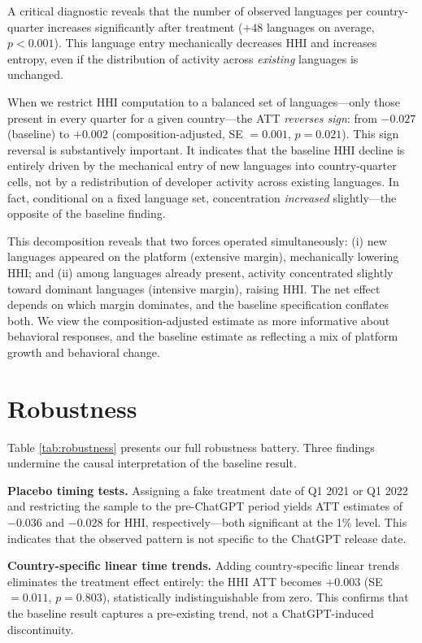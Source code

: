 \documentclass[12pt]{article}
\begin{document}
A critical diagnostic reveals that the number of observed languages per country-quarter increases significantly after treatment ($+48$ languages on average, $p < 0.001$). This language entry mechanically decreases HHI and increases entropy, even if the distribution of activity across \textit{existing} languages is unchanged.

When we restrict HHI computation to a balanced set of languages---only those present in every quarter for a given country---the ATT \textit{reverses sign}: from $-0.027$ (baseline) to $+0.002$ (composition-adjusted, SE $= 0.001$, $p = 0.021$). This sign reversal is substantively important. It indicates that the baseline HHI decline is entirely driven by the mechanical entry of new languages into country-quarter cells, not by a redistribution of developer activity across existing languages. In fact, conditional on a fixed language set, concentration \textit{increased} slightly---the opposite of the baseline finding.

This decomposition reveals that two forces operated simultaneously: (i) new languages appeared on the platform (extensive margin), mechanically lowering HHI; and (ii) among languages already present, activity concentrated slightly toward dominant languages (intensive margin), raising HHI. The net effect depends on which margin dominates, and the baseline specification conflates both. We view the composition-adjusted estimate as more informative about behavioral responses, and the baseline estimate as reflecting a mix of platform growth and behavioral change.

\section{Robustness}

Table \ref{tab:robustness} presents our full robustness battery. Three findings undermine the causal interpretation of the baseline result.

\textbf{Placebo timing tests.} Assigning a fake treatment date of Q1 2021 or Q1 2022 and restricting the sample to the pre-ChatGPT period yields ATT estimates of $-0.036$ and $-0.028$ for HHI, respectively---both significant at the 1\% level. This indicates that the observed pattern is not specific to the ChatGPT release date.

\textbf{Country-specific linear time trends.} Adding country-specific linear trends eliminates the treatment effect entirely: the HHI ATT becomes $+0.003$ (SE $= 0.011$, $p = 0.803$), statistically indistinguishable from zero. This confirms that the baseline result captures a pre-existing trend, not a ChatGPT-induced discontinuity.
\end{document}
